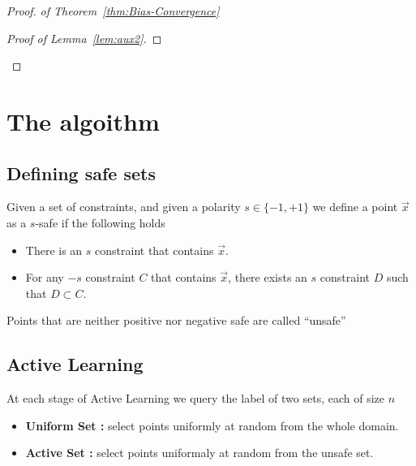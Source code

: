 \documentclass{article}
\newcommand{\x}{\vec{x}}
\newcommand{\bias}{\text{bias}}
\newcommand{\samp}{S}
\begin{document}
\begin{proof} {\em of Theorem~\ref{thm:Bias-Convergence}}
\begin{proof}[Proof of Lemma~\ref{lem:aux2}]
\end{proof}

%

\iffalse
Further assume that $\bias(B) = 0.8$,  that $\bias_{\samp_1}(B)=0$, and that $k_1(B)$
is sufficiently large so the $\lvert \bias_{\samp_1}(B) -  \bias(B)\rvert \geq \sqrt{\frac{100d\log n + \log(1/\delta)}{k_1(B)} }$.
Now, since $p(B) \leq 1/1000n$ it follows that $k_2(B)=0$ with probability at least $0.99$.
Now, it is plausible to define $\bias_{\samp_2}(B)=0$ when $k_2(B)=0$,
and therefore we get that $\bias_{\samp_2}=\bias_{\samp_1}=0$ with probability at least $0.99$ and so the event $E_2$ occurs with probability less than $0.01$,
unlike what we wanted.
\fi
\end{proof}

\section{The algoithm}

\subsection{Defining safe sets}

Given a set of constraints, and given a polarity  $s \in
\{-1,+1\}$ we define a point $\x$ as a $s$-safe if
the following holds
\begin{itemize}
\item There is an $s$ constraint that contains $\x$.
\item For any $-s$ constraint $C$ that contains $\x$, there exists an
  $s$ constraint $D$ such that $D \subset C$. 
\end{itemize}

Points that are neither positive nor negative safe are called
``unsafe''

\subsection{Active Learning}

At each stage of Active Learning we query the label of two sets, each
of size $n$
\begin{itemize}
\item {\bf Uniform Set :} select points uniformly at random from the whole
  domain.
\item {\bf Active Set :} select points uniformaly at random from the unsafe
  set.
\end{itemize}
\end{document}
